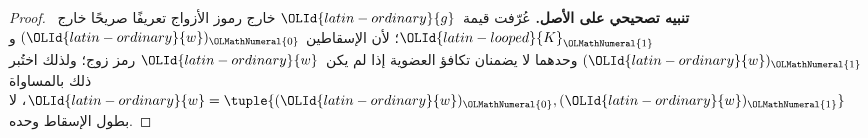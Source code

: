 \documentclass[../../../include/open-logic-section]{subfiles}
\begin{document}
\begin{proof}
\textbf{تنبيه تصحيحي على الأصل.} عُرّفت قيمة~$\OLId{latin-ordinary}{g}$ خارج رموز الأزواج
تعريفًا صريحًا خارج~$\OLId{latin-looped}{K}_\OLMathNumeral{1}$؛ لأن الإسقاطين $(\OLId{latin-ordinary}{w})_\OLMathNumeral{0}$ و$(\OLId{latin-ordinary}{w})_\OLMathNumeral{1}$ وحدهما
لا يضمنان تكافؤ العضوية إذا لم يكن~$\OLId{latin-ordinary}{w}$ رمز زوج؛ ولذلك اختُبر ذلك
بالمساواة $\OLId{latin-ordinary}{w}=\tuple{(\OLId{latin-ordinary}{w})_\OLMathNumeral{0},(\OLId{latin-ordinary}{w})_\OLMathNumeral{1}}$، لا بطول الإسقاط وحده.
\end{proof}
\end{document}
